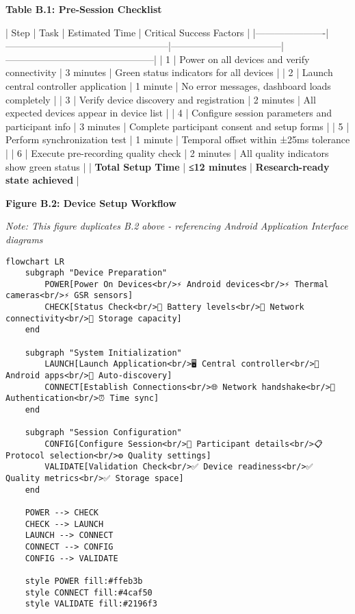 \documentclass[11pt,a4paper]{article}
\begin{document}
\textbf{Table B.1: Pre-Session Checklist}

| Step                 | Task                                              | Estimated Time                    | Critical Success Factors                      |
|----------------------|---------------------------------------------------|-----------------------------------|-----------------------------------------------|
| 1                    | Power on all devices and verify connectivity      | 3 minutes                         | Green status indicators for all devices       |
| 2                    | Launch central controller application             | 1 minute                          | No error messages, dashboard loads completely |
| 3                    | Verify device discovery and registration          | 2 minutes                         | All expected devices appear in device list    |
| 4                    | Configure session parameters and participant info | 3 minutes                         | Complete participant consent and setup forms  |
| 5                    | Perform synchronization test                      | 1 minute                          | Temporal offset within ±25ms tolerance        |
| 6                    | Execute pre-recording quality check               | 2 minutes                         | All quality indicators show green status      |
| \textbf{Total Setup Time} | \textbf{≤12 minutes}                                   | \textbf{Research-ready state achieved} |

\textbf{Figure B.2: Device Setup Workflow}

\textit{Note: This figure duplicates B.2 above - referencing Android Application Interface diagrams}

\begin{verbatim}
flowchart LR
    subgraph "Device Preparation"
        POWER[Power On Devices<br/>⚡ Android devices<br/>⚡ Thermal cameras<br/>⚡ GSR sensors]
        CHECK[Status Check<br/>📱 Battery levels<br/>📶 Network connectivity<br/>💾 Storage capacity]
    end

    subgraph "System Initialization"
        LAUNCH[Launch Application<br/>🖥️ Central controller<br/>📱 Android apps<br/>🔗 Auto-discovery]
        CONNECT[Establish Connections<br/>🌐 Network handshake<br/>🔐 Authentication<br/>⏰ Time sync]
    end

    subgraph "Session Configuration"
        CONFIG[Configure Session<br/>👤 Participant details<br/>📋 Protocol selection<br/>⚙️ Quality settings]
        VALIDATE[Validation Check<br/>✅ Device readiness<br/>✅ Quality metrics<br/>✅ Storage space]
    end

    POWER --> CHECK
    CHECK --> LAUNCH
    LAUNCH --> CONNECT
    CONNECT --> CONFIG
    CONFIG --> VALIDATE

    style POWER fill:#ffeb3b
    style CONNECT fill:#4caf50
    style VALIDATE fill:#2196f3
\end{verbatim}
\end{document}
